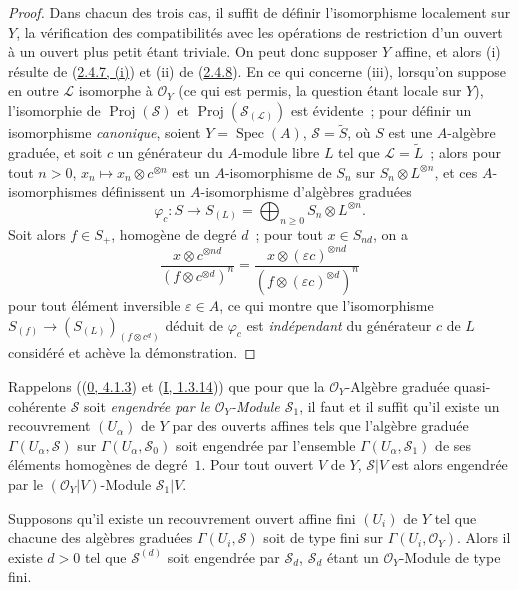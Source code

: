 \begin{proof}
Dans chacun des trois cas, il suffit de définir l'isomorphisme localement sur
$Y$, la vérification des compatibilités avec les opérations de restriction
d'un ouvert à un ouvert plus petit étant triviale. On peut donc supposer $Y$
affine, et alors (i) résulte de (\hyperref[II.2.4.7-fr]{2.4.7, (i)}) et (ii)
de (\hyperref[II.2.4.8-fr]{2.4.8}). En ce qui concerne (iii), lorsqu'on
suppose en outre $\mathcal{L}$ isomorphe à $\mathcal{O}_Y$ (ce qui est permis,
la question étant locale sur $Y$), l'isomorphie de
$\operatorname{Proj}(\mathcal{S})$ et
$\operatorname{Proj}(\mathcal{S}_{(\mathcal{L})})$ est évidente~; pour
définir un isomorphisme \emph{canonique}, soient
$Y=\operatorname{Spec}(A)$, $\mathcal{S}=\widetilde{S}$, où $S$ est une
$A$-algèbre graduée, et soit $c$ un générateur du $A$-module libre $L$ tel
que $\mathcal{L}=\widetilde{L}$~; alors pour tout $n>0$,
$x_n\mapsto x_n\otimes c^{\otimes n}$ est un $A$-isomorphisme de $S_n$ sur
$S_n\otimes L^{\otimes n}$, et ces $A$-isomorphismes définissent un
$A$-isomorphisme d'algèbres graduées
\[
  \varphi_c:S\longrightarrow S_{(L)}
  =\bigoplus_{n\geq0}S_n\otimes L^{\otimes n}.
\]
Soit alors $f\in S_+$, homogène de degré $d$~; pour tout $x\in S_{nd}$, on a
\[
  \frac{x\otimes c^{\otimes nd}}{(f\otimes c^{\otimes d})^n}
  =\frac{x\otimes(\varepsilon c)^{\otimes nd}}
  {(f\otimes(\varepsilon c)^{\otimes d})^n}
\]
pour tout élément inversible $\varepsilon\in A$, ce qui montre que
l'isomorphisme $S_{(f)}\to(S_{(L)})_{(f\otimes c^d)}$ déduit de $\varphi_c$
est \emph{indépendant} du générateur $c$ de $L$ considéré et achève la
démonstration.
\end{proof}

\begin{env}[3.1.9]
\label{II.3.1.9-fr}
Rappelons ((\hyperref[0.4.1.3-fr]{0, 4.1.3}) et
(\hyperref[I.1.3.14-fr]{I, 1.3.14})) que pour que la
$\mathcal{O}_Y$-Algèbre graduée quasi-cohérente $\mathcal{S}$ soit
\emph{engendrée par le $\mathcal{O}_Y$-Module $\mathcal{S}_1$}, il faut et il
suffit qu'il existe un recouvrement $(U_\alpha)$ de $Y$ par des ouverts
affines tels que l'algèbre graduée $\Gamma(U_\alpha,\mathcal{S})$ sur
$\Gamma(U_\alpha,\mathcal{S}_0)$ soit engendrée par l'ensemble
$\Gamma(U_\alpha,\mathcal{S}_1)$ de ses éléments homogènes de degré~$1$. Pour
tout ouvert $V$ de $Y$, $\mathcal{S}|V$ est alors engendrée par le
$(\mathcal{O}_Y|V)$-Module $\mathcal{S}_1|V$.
\end{env}

\begin{proposition}[3.1.10]
\label{II.3.1.10-fr}
Supposons qu'il existe un recouvrement ouvert affine fini $(U_i)$ de $Y$ tel
que chacune des algèbres graduées $\Gamma(U_i,\mathcal{S})$ soit de type fini
sur $\Gamma(U_i,\mathcal{O}_Y)$. Alors il existe $d>0$ tel que
$\mathcal{S}^{(d)}$ soit engendrée par $\mathcal{S}_d$, $\mathcal{S}_d$ étant
un $\mathcal{O}_Y$-Module de type fini.
\end{proposition}

